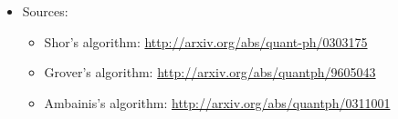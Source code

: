 \documentclass{beamer}
\begin{document}
\begin{frame}
	\begin{itemize}
    	\item Sources:
        	\begin{itemize}
            	\item Shor's algorithm: \url{http://arxiv.org/abs/quant-ph/0303175}
                \item Grover's algorithm: \url{http://arxiv.org/abs/quantph/9605043}
                \item Ambainis's algorithm: \url{http://arxiv.org/abs/quantph/0311001}
            \end{itemize}
    \end{itemize}
\end{frame}


\end{document}
